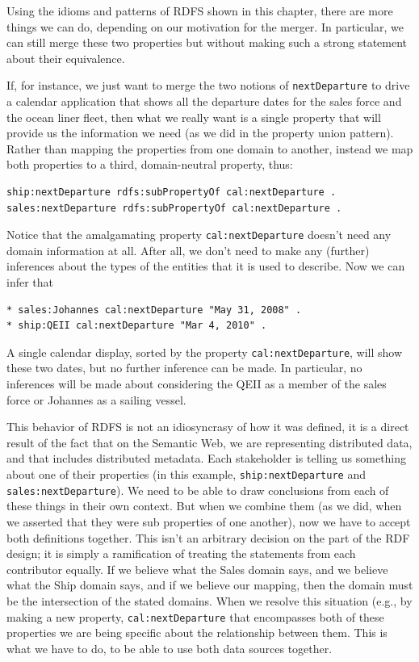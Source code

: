 Using the idioms and patterns of RDFS shown in this chapter, there are
more things we can do, depending on our motivation for the merger. In
particular, we can still merge these two properties but without making
such a strong statement about their equivalence.

If, for instance, we just want to merge the two notions of \texttt{nextDeparture}
to drive a calendar application that shows all the departure dates for
the sales force and the ocean liner fleet, then what we really want is a
single property that will provide us the information we need (as we did
in the property union pattern). Rather than mapping the properties from
one domain to another, instead we map both properties to a third,
domain-neutral property, thus:

\begin{lstlisting}
ship:nextDeparture rdfs:subPropertyOf cal:nextDeparture .
sales:nextDeparture rdfs:subPropertyOf cal:nextDeparture .
\end{lstlisting}

Notice that the amalgamating property \texttt{cal:nextDeparture} doesn't need any
domain information at all. After all, we don't need to make any
(further) inferences about the types of the entities that it is used to
describe. Now we can infer that

\begin{lstlisting}
* sales:Johannes cal:nextDeparture "May 31, 2008" .
* ship:QEII cal:nextDeparture "Mar 4, 2010" .
\end{lstlisting}

A single calendar display, sorted by the property \texttt{cal:nextDeparture},
will show these two dates, but no further inference can be made. In
particular, no inferences will be made about considering the QEII as a
member of the sales force or Johannes as a sailing vessel.

This behavior of RDFS is not an idiosyncrasy of how it was defined, it is
a direct result of the fact that on the Semantic Web, we are representing distributed
data, and that includes distributed metadata.  Each stakeholder is telling us 
something about one of their properties (in this example, \texttt{ship:nextDeparture} and
\texttt{sales:nextDeparture}).  We need to be able to draw conclusions from 
each of these things in their own context.  But when we combine them (as 
we did, when we asserted that they were sub properties of one another), now we 
have to accept both definitions together.  This isn't an arbitrary decision on 
the part of the RDF design; it is simply a ramification of treating the statements
from each contributor equally.  If we believe what the Sales domain says, and we believe
what the Ship domain says, and if we believe our mapping, then the domain must 
be the intersection of the stated domains.   When we resolve this situation (e.g., by
making a new property, \texttt{cal:nextDeparture} that encompasses both of these properties
we are being specific about the relationship between them.  This is what we have to
do, to be able to use both data sources together. 

